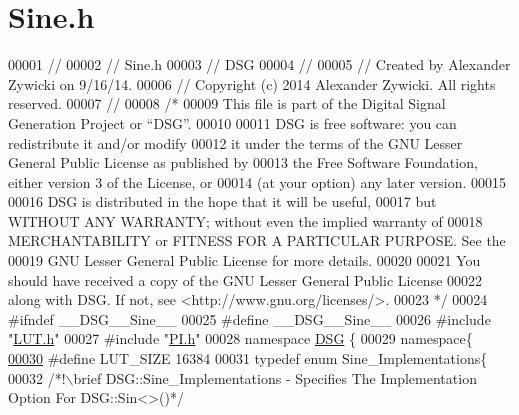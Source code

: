 \hypertarget{_sine_8h_source}{\section{Sine.\+h}
\label{_sine_8h_source}
}

\begin{DoxyCode}
00001 \textcolor{comment}{//}
00002 \textcolor{comment}{//  Sine.h}
00003 \textcolor{comment}{//  DSG}
00004 \textcolor{comment}{//}
00005 \textcolor{comment}{//  Created by Alexander Zywicki on 9/16/14.}
00006 \textcolor{comment}{//  Copyright (c) 2014 Alexander Zywicki. All rights reserved.}
00007 \textcolor{comment}{//}
00008 \textcolor{comment}{/*}
00009 \textcolor{comment}{ This file is part of the Digital Signal Generation Project or “DSG”.}
00010 \textcolor{comment}{}
00011 \textcolor{comment}{ DSG is free software: you can redistribute it and/or modify}
00012 \textcolor{comment}{ it under the terms of the GNU Lesser General Public License as published by}
00013 \textcolor{comment}{ the Free Software Foundation, either version 3 of the License, or}
00014 \textcolor{comment}{ (at your option) any later version.}
00015 \textcolor{comment}{}
00016 \textcolor{comment}{ DSG is distributed in the hope that it will be useful,}
00017 \textcolor{comment}{ but WITHOUT ANY WARRANTY; without even the implied warranty of}
00018 \textcolor{comment}{ MERCHANTABILITY or FITNESS FOR A PARTICULAR PURPOSE.  See the}
00019 \textcolor{comment}{ GNU Lesser General Public License for more details.}
00020 \textcolor{comment}{}
00021 \textcolor{comment}{ You should have received a copy of the GNU Lesser General Public License}
00022 \textcolor{comment}{ along with DSG.  If not, see <http://www.gnu.org/licenses/>.}
00023 \textcolor{comment}{ */}
00024 \textcolor{preprocessor}{#ifndef \_\_DSG\_\_Sine\_\_}
00025 \textcolor{preprocessor}{#define \_\_DSG\_\_Sine\_\_}
00026 \textcolor{preprocessor}{#include "\hyperlink{_l_u_t_8h}{LUT.h}"}
00027 \textcolor{preprocessor}{#include "\hyperlink{_p_i_8h}{PI.h}"}
00028 \textcolor{keyword}{namespace }\hyperlink{namespace_d_s_g}{DSG} \{
00029     \textcolor{keyword}{namespace}\{
\hypertarget{_sine_8h_source_l00030}{}\hyperlink{_sine_8h_aebfcb45923a56e8581fda080243ec5bb}{00030} \textcolor{preprocessor}{            #define LUT\_SIZE 16384}
00031         \textcolor{keyword}{typedef} \textcolor{keyword}{enum} Sine\_Implementations\{\textcolor{comment}{}
00032 \textcolor{comment}{            /*!\(\backslash\)brief DSG::Sine\_Implementations - Specifies The Implementation Option For DSG::Sin<>()*/}

\end{DoxyCode}

